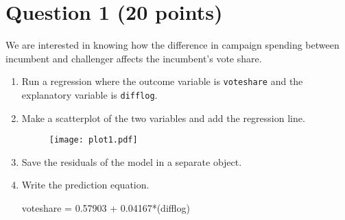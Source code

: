 \documentclass[12pt,letterpaper]{article}
\begin{document}
\section*{Question 1 (20 points)}
\vspace{.25cm}
\noindent We are interested in knowing how the difference in campaign spending between incumbent and challenger affects the incumbent's vote share. 
	\begin{enumerate}
		\item Run a regression where the outcome variable is \texttt{voteshare} and the explanatory variable is \texttt{difflog}.	
		  
		
		
		
		\item Make a scatterplot of the two variables and add the regression line. 	
	 	 
	 	\begin{figure}[h!]\centering
	 			
					\texttt{[image: plot1.pdf]}
					
		\end{figure}
	
		 
		
		 
	
		\item Save the residuals of the model in a separate object.	
		
		 
		
		\item Write the prediction equation.
		
		voteshare =  0.57903 + 0.04167*(difflog)
	\end{enumerate}
	
\newpage
\end{document}
